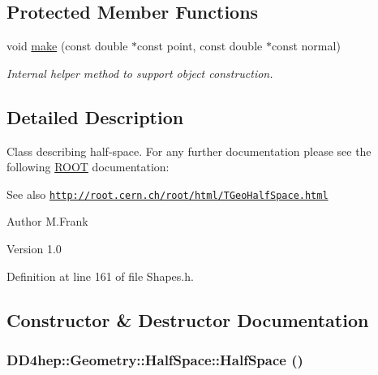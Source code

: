 \subsection*{Protected Member Functions}
\begin{DoxyCompactItemize}
\item 
void \hyperlink{class_d_d4hep_1_1_geometry_1_1_half_space_abd2d6beb48210e1a9e29d6f16748b6dc}{make} (const double $\ast$const point, const double $\ast$const normal)
\begin{DoxyCompactList}\small\item\em Internal helper method to support object construction. \item\end{DoxyCompactList}\end{DoxyCompactItemize}


\subsection{Detailed Description}
Class describing half-\/space. For any further documentation please see the following \hyperlink{namespace_r_o_o_t}{ROOT} documentation: \begin{DoxySeeAlso}{See also}
\href{http://root.cern.ch/root/html/TGeoHalfSpace.html}{\tt http://root.cern.ch/root/html/TGeoHalfSpace.html}
\end{DoxySeeAlso}
\begin{DoxyAuthor}{Author}
M.Frank 
\end{DoxyAuthor}
\begin{DoxyVersion}{Version}
1.0 
\end{DoxyVersion}


Definition at line 161 of file Shapes.h.

\subsection{Constructor \& Destructor Documentation}
\hypertarget{class_d_d4hep_1_1_geometry_1_1_half_space_a5f03b7cfc3c691169bfacced429135a1}{
\subsubsection[{HalfSpace}]{\setlength{\rightskip}{0pt plus 5cm}DD4hep::Geometry::HalfSpace::HalfSpace ()}}
\label{class_d_d4hep_1_1_geometry_1_1_half_space_a5f03b7cfc3c691169bfacced429135a1}


